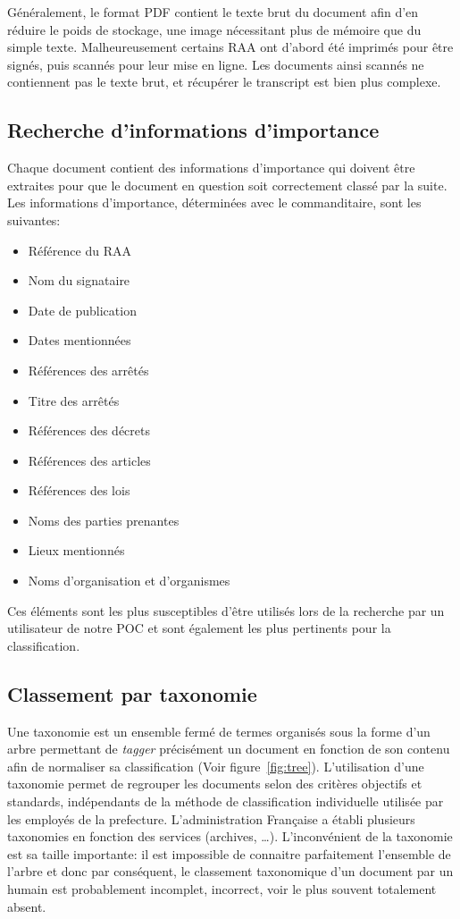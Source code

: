 Généralement, le format PDF contient le texte brut du document afin d'en réduire le poids de stockage, une image nécessitant plus de mémoire que du simple texte.
Malheureusement certains RAA ont d'abord été imprimés pour être signés, puis scannés pour leur mise en ligne.
Les documents ainsi scannés ne contiennent pas le texte brut, et récupérer le transcript est bien plus complexe.


\subsection{Recherche d'informations d'importance}\label{infosImp}
Chaque document contient des informations d'importance qui doivent être extraites pour que le document en question soit correctement classé par la suite.
Les informations d'importance, déterminées avec le commanditaire, sont les suivantes:
\begin{itemize}
\item Référence du RAA
\item Nom du signataire
\item Date de publication
\item Dates mentionnées
\item Références des arrêtés
\item Titre des arrêtés
\item Références des décrets
\item Références des articles
\item Références des lois
\item Noms des parties prenantes
\item Lieux mentionnés
\item Noms d'organisation et d'organismes
\end{itemize}

Ces éléments sont les plus susceptibles d'être utilisés lors de la recherche par un utilisateur de notre POC et sont également les plus pertinents pour la classification.



\subsection{Classement par taxonomie}
Une taxonomie est un ensemble fermé de termes organisés sous la forme d'un arbre permettant de \textit{tagger} précisément un document en fonction de son contenu afin de normaliser sa classification (Voir figure~\ref{fig:tree}).
L'utilisation d'une taxonomie permet de regrouper les documents selon des critères objectifs et standards, indépendants de la méthode de classification individuelle utilisée par les employés de la prefecture.
L'administration Française a établi plusieurs taxonomies en fonction des services (archives, \ldots).
L'inconvénient de la taxonomie est sa taille importante: il est impossible de connaitre parfaitement l'ensemble de l'arbre et donc par conséquent, le classement taxonomique d'un document par un humain est probablement incomplet, incorrect, voir le plus souvent totalement absent.

